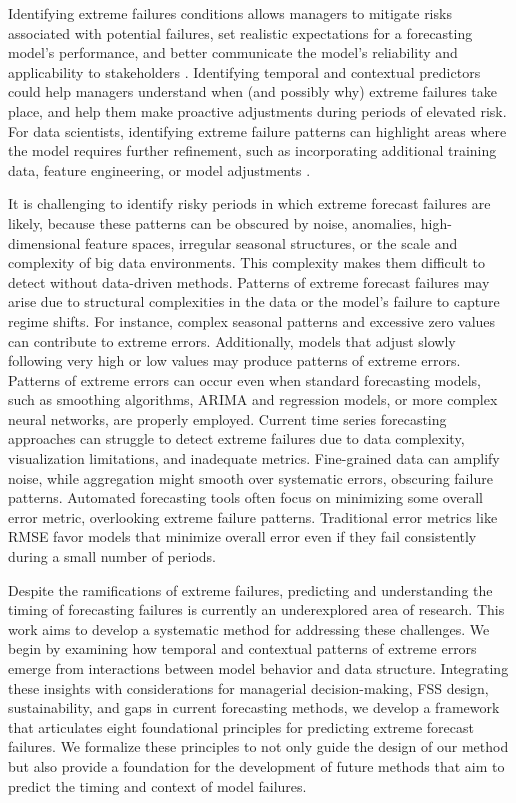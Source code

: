 \documentclass[]{interact}
\theoremstyle{plain}
\theoremstyle{definition}
\theoremstyle{remark}
\begin{document}
Identifying extreme failures conditions allows managers to mitigate risks associated with potential failures, set realistic expectations for a forecasting model's performance, and better communicate the model's reliability and applicability to stakeholders \citep{cakmak2024}. Identifying temporal and contextual predictors could help managers understand when (and possibly why) extreme failures take place, and help them make proactive adjustments during periods of elevated risk. For data scientists, identifying extreme failure patterns can highlight areas where the model requires further refinement, such as incorporating additional training data, feature engineering, or model adjustments \citep{cakmak2024}.

It is challenging to identify risky periods in which extreme forecast failures are likely, because these patterns can be obscured by noise, anomalies, high-dimensional feature spaces, irregular seasonal structures, or the scale and complexity of big data environments. This complexity makes them difficult to detect without data-driven methods. Patterns of extreme forecast failures may arise due to structural complexities in the data or the model's failure to capture regime shifts. For instance, complex seasonal patterns and excessive zero values can contribute to extreme errors. Additionally, models that adjust slowly following very high or low values may produce patterns of extreme errors. Patterns of extreme errors can occur even when standard forecasting models, such as smoothing algorithms, ARIMA and regression models, or more complex neural networks, are properly employed. Current time series forecasting approaches can struggle to detect extreme failures due to data complexity, visualization limitations, and inadequate metrics. Fine-grained data can amplify noise, while aggregation might smooth over systematic errors, obscuring failure patterns. Automated forecasting tools often focus on minimizing some overall error metric, overlooking extreme failure patterns. Traditional error metrics like RMSE favor models that minimize overall error even if they fail consistently during a small number of periods.

Despite the ramifications of extreme failures, predicting and understanding the timing of forecasting failures is currently an underexplored area of research. This work aims to develop a systematic method for addressing these challenges. We begin by examining how temporal and contextual patterns of extreme errors emerge from interactions between model behavior and data structure. Integrating these insights with considerations for managerial decision-making, FSS design, sustainability, and gaps in current forecasting methods, we develop a framework that articulates eight foundational principles for predicting extreme forecast failures. We formalize these principles to not only guide the design of our method but also provide a foundation for the development of future methods that aim to predict the timing and context of model failures.
\end{document}
